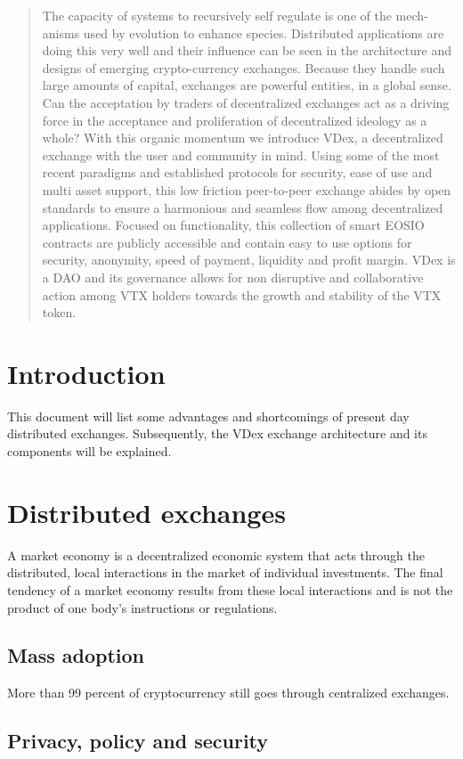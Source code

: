 \documentclass[]{article}
\begin{document}
\begin{abstract}
The capacity of systems to recursively self regulate is one of the mech-
anisms used by evolution to enhance species. Distributed applications are
doing this very well and their influence can be seen in the architecture
and designs of emerging crypto-currency exchanges. Because they handle
such large amounts of capital, exchanges are powerful entities, in a global
sense. Can the acceptation by traders of decentralized exchanges act as a
driving force in the acceptance and proliferation of decentralized ideology
as a whole? 
With this organic momentum we introduce VDex, a decentralized exchange 
with the user and community in mind. Using some of the most recent paradigms 
and established protocols for security, ease of use and multi asset support, 
this low friction peer-to-peer exchange abides by open standards to ensure 
a harmonious and seamless flow among decentralized applications. 
Focused on functionality, this collection of smart EOSIO contracts are 
publicly accessible and contain easy to use options for security, anonymity, 
speed of payment, liquidity and profit margin.
VDex is a DAO and its governance allows for non disruptive and collaborative action among VTX holders towards the growth and stability of the
VTX token.
\end{abstract}
\section{Introduction}
This document will list some advantages and shortcomings of present 
day distributed exchanges. 
Subsequently, the VDex exchange architecture and its components will be explained.


\section{Distributed exchanges}
	A market economy is a decentralized economic system that acts through the distributed, 
	local interactions in the market of individual investments. 
	The final tendency of a market economy results from these local 
	interactions and is not the product of one body's instructions or regulations.
	\subsection{Mass adoption}
	More than 99 percent of cryptocurrency still goes through centralized exchanges.
	\subsection{Privacy, policy and security}
\end{document}
